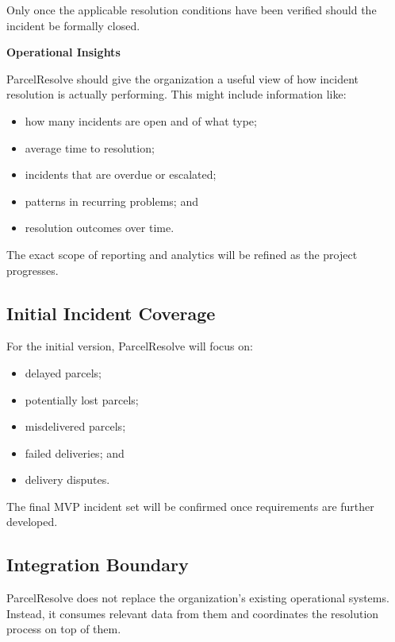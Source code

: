 \documentclass[11pt,a4paper]{article}
\begin{document}
Only once the applicable resolution conditions have been verified
should the incident be formally closed.


\textbf{Operational Insights}

ParcelResolve should give the organization a useful view of how
incident resolution is actually performing. This might include
information like:

\begin{itemize}
    \item how many incidents are open and of what type;
    \item average time to resolution;
    \item incidents that are overdue or escalated;
    \item patterns in recurring problems; and
    \item resolution outcomes over time.
\end{itemize}

The exact scope of reporting and analytics will be refined as the
project progresses.


\subsection{Initial Incident Coverage}

For the initial version, ParcelResolve will focus on:

\begin{itemize}
    \item delayed parcels;
    \item potentially lost parcels;
    \item misdelivered parcels;
    \item failed deliveries; and
    \item delivery disputes.
\end{itemize}

The final MVP incident set will be confirmed once requirements are
further developed.


\subsection{Integration Boundary}

ParcelResolve does not replace the organization's existing operational
systems. Instead, it consumes relevant data from them and coordinates
the resolution process on top of them.
\end{document}
